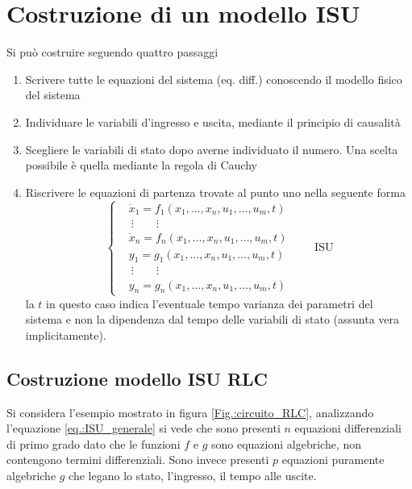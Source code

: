 \section{Costruzione di un modello ISU}
Si può costruire seguendo quattro passaggi
\begin{enumerate}
\item Scrivere tutte le equazioni del sistema (eq. diff.) conoscendo il modello fisico del sistema
\item Individuare le variabili d'ingresso e uscita, mediante il principio di causalità
\item Scegliere le variabili di stato dopo averne individuato il numero. Una scelta possibile è
quella mediante la regola di Cauchy
\item Riscrivere le equazioni di partenza trovate al punto uno nella seguente forma
\begin{equation}\left\{ \begin{aligned}
&\dot{x}_1 = f_1\left(x_1,\ldots,x_n,u_1,\ldots,u_m,t\right)\\
&\ \vdots \qquad \vdots\\
&\dot{x}_n = f_n\left(x_1,\ldots,x_n,u_1,\ldots,u_m,t\right)\\
&y_1 = g_1\left(x_1,\ldots,x_n,u_1,\ldots,u_m,t\right) \\
&\ \vdots \qquad \vdots\\
&y_n = g_n\left(x_1,\ldots,x_n,u_1,\ldots,u_m,t\right)
\end{aligned}\right.\qquad\text{ISU}
\label{eq.:ISU_generale}
\end{equation}
la $t$ in questo caso indica l'eventuale tempo varianza dei parametri del sistema e non la
dipendenza dal tempo delle variabili di stato (assunta vera implicitamente).
\end{enumerate}

\subsection{Costruzione modello ISU RLC}
Si considera l'esempio mostrato in figura \ref{Fig.:circuito_RLC}, analizzando l'equazione
\ref{eq.:ISU_generale} si vede che sono presenti $n$ equazioni differenziali di primo grado dato
che le funzioni $f$ e $g$ sono equazioni algebriche, non contengono termini differenziali.
Sono invece presenti $p$ equazioni puramente algebriche $g$ che legano lo stato, l'ingresso, il
tempo alle uscite.


